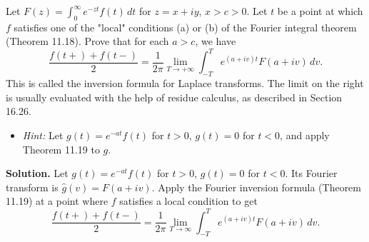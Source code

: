 \begin{problembox}
Let $F(z) = \int_0^\infty e^{-zt} f(t) \, dt$ for $z = x + iy$, $x > c > 0$. Let $t$ be a point at which $f$ satisfies one of the "local" conditions (a) or (b) of the Fourier integral theorem (Theorem 11.18). Prove that for each $a > c$, we have
\[
\frac{f(t+) + f(t-)}{2} = \frac{1}{2\pi} \lim_{T \to +\infty} \int_{-T}^T e^{(a + iv)t} F(a + iv) \, dv.
\]
This is called the inversion formula for Laplace transforms. The limit on the right is usually evaluated with the help of residue calculus, as described in Section 16.26.
\begin{itemize}
\item \textit{Hint:} Let $g(t) = e^{-at} f(t)$ for $t > 0$, $g(t) = 0$ for $t < 0$, and apply Theorem 11.19 to $g$.
\end{itemize}
\end{problembox}

\noindent\textbf{Solution.}
Let $g(t)=e^{-at}f(t)$ for $t>0$, $g(t)=0$ for $t<0$. Its Fourier transform is $\widehat g(v)=F(a+iv)$. Apply the Fourier inversion formula (Theorem 11.19) at a point where $f$ satisfies a local condition to get
\[\frac{f(t+)+f(t-)}{2}=\frac{1}{2\pi}\lim_{T\to\infty}\int_{-T}^T e^{(a+iv)t}F(a+iv)\,dv.\]

